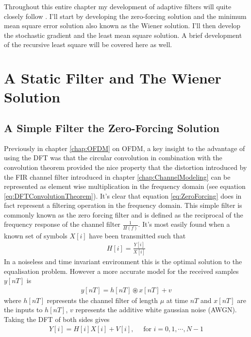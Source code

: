 Throughout this entire chapter my development of adaptive filters %
will quite closely follow \cite{Hay02}. I'll start by %
developing the zero-forcing solution and the minimum mean square %
error solution also known as the Wiener solution. I'll then develop %
the stochastic gradient and the least mean square solution. A brief %
development of the recursive least square will be covered here as %
well.

\section{A Static Filter and The Wiener Solution}
\subsection{A Simple Filter the Zero-Forcing Solution}
\label{subsec:ZeroForcing}
Previously in chapter \ref{chap:OFDM} on OFDM, a key insight to %
the advantage of using the DFT was that the circular convolution %
in combination with the convolution theorem provided the nice %
property that the distortion introduced by the FIR channel filter %
introduced in chapter \ref{chap:ChannelModeling} can be represented %
as element wise multiplication in the frequency domain (see equation %
\ref{eq:DFTConvolutionTheorem}). It's clear that equation %
\ref{eq:ZeroForcing} does in fact represent a filtering operation %
in the frequency domain. This simple filter is commonly known as %
the zero forcing filter and is defined as the reciprocal of the %
frequency response of the channel filter $\frac{1}{H(f)}$. %
It's most easily found when a known set of symbols $X[i]$ have %
been transmitted such that
\begin{align}
	H\left[i\right] = \frac{Y\left[i\right]}{X\left[i\right]}
\end{align}
In a noiseless and time invariant environment this is the optimal %
solution to the equalisation problem. However a more accurate %
model for the received samples $y[nT]$ is
\begin{align}
	y[nT]=h[nT]\circledast x[nT]%
	+ v
\end{align}
where $h[nT]$ represents the channel filter of length %
$\mu$ at time $nT$ and $x[nT]$ are the inputs to %
$h[nT]$, $v$ represents the additive white gaussian %
noise (AWGN). Taking the DFT of both sides gives %
\begin{align}
	Y[i] = H[i]X[i] + V[i]%
	,\quad \text{ for } i = 0,1,\cdots,N-1
	\label{eq:AWGNModel}
\end{align}
